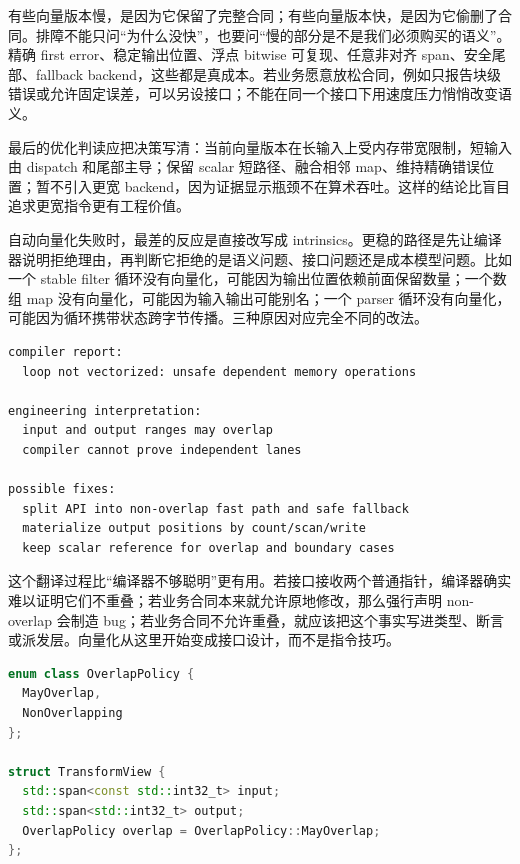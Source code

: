 有些向量版本慢，是因为它保留了完整合同；有些向量版本快，是因为它偷删了合同。排障不能只问“为什么没快”，也要问“慢的部分是不是我们必须购买的语义”。精确 first error、稳定输出位置、浮点 bitwise 可复现、任意非对齐 span、安全尾部、fallback backend，这些都是真成本。若业务愿意放松合同，例如只报告块级错误或允许固定误差，可以另设接口；不能在同一个接口下用速度压力悄悄改变语义。

最后的优化判读应把决策写清：当前向量版本在长输入上受内存带宽限制，短输入由 dispatch 和尾部主导；保留 scalar 短路径、融合相邻 map、维持精确错误位置；暂不引入更宽 backend，因为证据显示瓶颈不在算术吞吐。这样的结论比盲目追求更宽指令更有工程价值。

自动向量化失败时，最差的反应是直接改写成 intrinsics。更稳的路径是先让编译器说明拒绝理由，再判断它拒绝的是语义问题、接口问题还是成本模型问题。比如一个 stable filter 循环没有向量化，可能因为输出位置依赖前面保留数量；一个数组 map 没有向量化，可能因为输入输出可能别名；一个 parser 循环没有向量化，可能因为循环携带状态跨字节传播。三种原因对应完全不同的改法。

\begin{lstlisting}[numbers=none,caption={自动向量化诊断要翻译成工程原因}]
compiler report:
  loop not vectorized: unsafe dependent memory operations

engineering interpretation:
  input and output ranges may overlap
  compiler cannot prove independent lanes

possible fixes:
  split API into non-overlap fast path and safe fallback
  materialize output positions by count/scan/write
  keep scalar reference for overlap and boundary cases
\end{lstlisting}

这个翻译过程比“编译器不够聪明”更有用。若接口接收两个普通指针，编译器确实难以证明它们不重叠；若业务合同本来就允许原地修改，那么强行声明 non-overlap 会制造 bug；若业务合同不允许重叠，就应该把这个事实写进类型、断言或派发层。向量化从这里开始变成接口设计，而不是指令技巧。

\begin{lstlisting}[language=C++,caption={把别名事实写进接口边界}]
enum class OverlapPolicy {
  MayOverlap,
  NonOverlapping
};

struct TransformView {
  std::span<const std::int32_t> input;
  std::span<std::int32_t> output;
  OverlapPolicy overlap = OverlapPolicy::MayOverlap;
};
\end{lstlisting}

